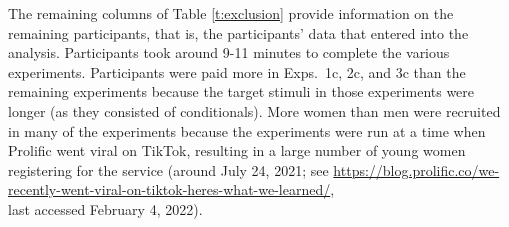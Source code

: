 \documentclass[11pt,fleqn]{article}
\newcommand{\6}{\mbox{$[\hspace*{-.6mm}[$}}
\newcommand{\9}{\mbox{$]\hspace*{-.6mm}]$}}
\begin{document}
  The remaining columns of Table \ref{t:exclusion} provide information on the remaining participants, that is, the participants' data that entered into the analysis. Participants took around 9-11 minutes to complete the various experiments. Participants were paid more in Exps.~1c, 2c, and 3c than the remaining experiments because the target stimuli in those experiments were longer (as they consisted of conditionals). More women than men were recruited in many of the experiments because the experiments were run at a time when Prolific went viral on TikTok, resulting in a large number of young women registering for the service (around July 24, 2021; see \url{https://blog.prolific.co/we-recently-went-viral-on-tiktok-heres-what-we-learned/}, \\ last accessed February 4, 2022).  
\end{document}
